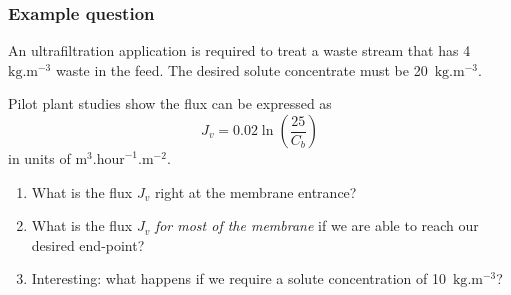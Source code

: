 \begin{frame}\frametitle{Example question}
	An ultrafiltration application is required to treat a waste stream that has 4~$\text{kg}\text{.m}^{-3}$ waste in the feed. The desired solute concentrate must be 20~$\text{kg}\text{.m}^{-3}$.

	\vspace{12pt}
	Pilot plant studies show the flux can be expressed as
	\[
		J_v = 0.02 \ln \left(\frac{25}{C_b} \right)
	\]
	in units of $\text{m}^3.\text{hour}^{-1}.\text{m}^{-2}$. 
	

	\vspace{12pt}
	\begin{enumerate}
		\item	What is the flux $J_v$ right at the membrane entrance?
		\item	What is the flux $J_v$ \emph{{\color{myOrange}for most of the membrane}} if we are able to reach our desired end-point?
		\item	Interesting: what happens if we require a solute concentration of 10~$\text{kg}\text{.m}^{-3}$?
	\end{enumerate}
\end{frame}


